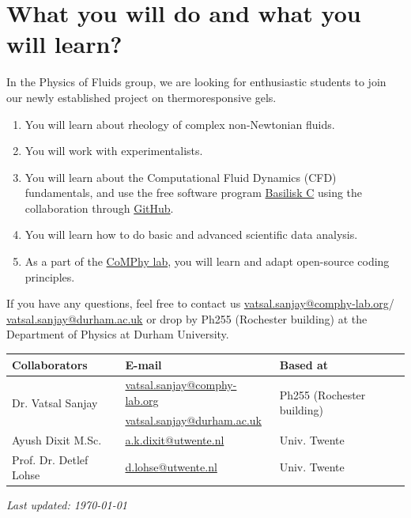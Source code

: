 \documentclass[11pt]{article}
\begin{document}
\section*{What you will do and what you will learn?}
In the Physics of Fluids group, we are looking for enthusiastic students to join our newly established project on thermoresponsive gels. 

\begin{enumerate}
	\item You will learn about rheology of complex non-Newtonian fluids. 
	\item You will work with experimentalists.
	\item You will learn about the Computational Fluid Dynamics (CFD) fundamentals, and use the free software program \href{http://basilisk.fr}{Basilisk C} using the collaboration through \href{https://github.com/comphy-lab/VP-DropImpact}{GitHub}.
	\item You will learn how to do basic and advanced scientific data analysis. 
	\item As a part of the \href{https://comphy-lab.org}{CoMPhy lab}, you will learn and adapt open-source coding principles. 
\end{enumerate}

If you have any questions, feel free to contact us \href{mailto:vatsal.sanjay@comphy-lab.org}{vatsal.sanjay@comphy-lab.org}/\\\href{mailto:vatsal.sanjay@durham.ac.uk}{vatsal.sanjay@durham.ac.uk} or drop by Ph255 (Rochester building) at the Department of Physics at Durham University.

\begin{center}
\begin{tabular}{|l|l|l|}
\hline \textbf{Collaborators} & \textbf{E-mail} & \textbf{Based at} \\
\hline \multirow{2}{*}{Dr. Vatsal Sanjay} & \href{mailto:vatsal.sanjay@comphy-lab.org}{vatsal.sanjay@comphy-lab.org} & \multirow{2}{*}{Ph255 (Rochester building)} \\
& \href{mailto:vatsal.sanjay@durham.ac.uk}{vatsal.sanjay@durham.ac.uk} & \\
\hline Ayush Dixit M.Sc. & \href{mailto:a.k.dixit@utwente.nl}{a.k.dixit@utwente.nl} & Univ. Twente \\
\hline Prof. Dr. Detlef Lohse & \href{mailto:d.lohse@utwente.nl}{d.lohse@utwente.nl} & Univ. Twente  \\
\hline
\end{tabular}
\end{center}

\vspace{1em}
\noindent\textit{Last updated: \today}

\printbibliography
\end{document}
